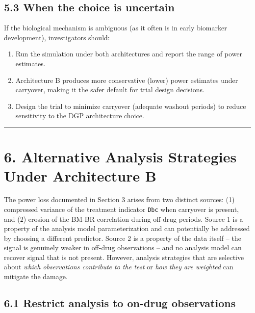 \documentclass[11pt]{article}
\begin{document}
\subsection{5.3 When the choice is uncertain}

If the biological mechanism is ambiguous (as it often is in early
biomarker development), investigators should:

\begin{enumerate}
\item Run the simulation under both architectures and report the
  range of power estimates.
\item Architecture B produces more conservative (lower)
  power estimates under carryover, making it the safer default
  for trial design decisions.
\item Design the trial to minimize carryover (adequate washout
  periods) to reduce sensitivity to the DGP architecture choice.
\end{enumerate}

\bigskip\noindent\rule{\textwidth}{0.4pt}\bigskip

\section{6. Alternative Analysis Strategies Under Architecture B}

The power loss documented in Section 3 arises from two distinct
sources: (1) compressed variance of the treatment indicator
\texttt{Dbc} when carryover is present, and (2) erosion of the
BM-BR correlation during off-drug periods. Source 1 is a
property of
the analysis model parameterization and can potentially be
addressed by choosing a different predictor. Source 2 is a
property of the data itself -- the signal is genuinely weaker in
off-drug observations -- and no analysis model can recover signal
that is not present. However, analysis strategies that are
selective about \textit{which observations contribute to the test} or
\textit{how they are weighted} can mitigate the damage.

\subsection{6.1 Restrict analysis to on-drug observations}
\end{document}
